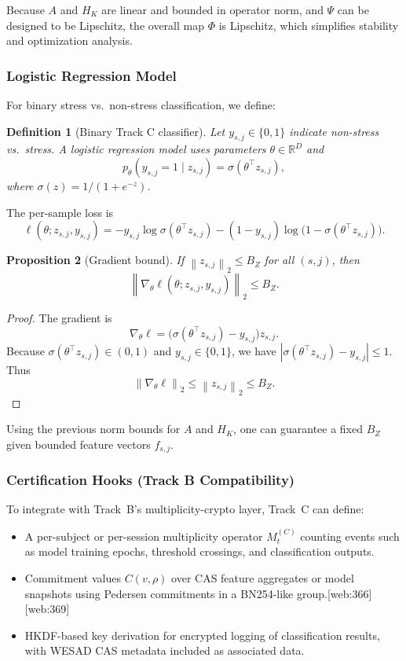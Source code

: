 \documentclass[11pt]{article}
\newtheorem{definition}{Definition}[section]
\newtheorem{proposition}[definition]{Proposition}
\newcommand{\R}{\mathbb{R}}
\newcommand{\norm}[1]{\left\lVert #1 \right\rVert}
\newcommand{\abs}[1]{\left\lvert #1 \right\rvert}
\begin{document}
Because \(A\) and \(H_K\) are linear and bounded in operator norm, and \(\Psi\) can be designed to be Lipschitz, the overall map \(\Phi\) is Lipschitz, which simplifies stability and optimization analysis.

\subsubsection{Logistic Regression Model}

For binary stress vs.\ non-stress classification, we define:

\begin{definition}[Binary Track C classifier]
Let \(y_{s,j} \in \{0,1\}\) indicate non-stress vs.\ stress.
A logistic regression model uses parameters \(\theta \in \R^D\) and
\[
  p_{\theta}(y_{s,j}=1 \mid z_{s,j}) = \sigma(\theta^\top z_{s,j}),
\]
where \(\sigma(z) = 1/(1+e^{-z})\).
\end{definition}

The per-sample loss is
\[
  \ell(\theta; z_{s,j}, y_{s,j})
  = -y_{s,j} \log \sigma(\theta^\top z_{s,j})
    - (1-y_{s,j}) \log \bigl(1-\sigma(\theta^\top z_{s,j})\bigr).
\]

\begin{proposition}[Gradient bound]
If \(\norm{z_{s,j}}_2 \le B_Z\) for all \((s,j)\), then
\[
  \norm{\nabla_\theta \ell(\theta; z_{s,j}, y_{s,j})}_2 \le B_Z.
\]
\end{proposition}

\begin{proof}
The gradient is
\[
  \nabla_\theta \ell = \bigl(\sigma(\theta^\top z_{s,j}) - y_{s,j}\bigr) z_{s,j}.
\]
Because \(\sigma(\theta^\top z_{s,j}) \in (0,1)\) and \(y_{s,j} \in \{0,1\}\), we have \(\abs{\sigma(\theta^\top z_{s,j}) - y_{s,j}} \le 1\).
Thus
\[
  \norm{\nabla_\theta \ell}_2 \le \norm{z_{s,j}}_2 \le B_Z.
\]
\end{proof}

Using the previous norm bounds for \(A\) and \(H_K\), one can guarantee a fixed \(B_Z\) given bounded feature vectors \(f_{s,j}\).

\subsubsection{Certification Hooks (Track B Compatibility)}

To integrate with Track~B's multiplicity-crypto layer, Track~C can define:

\begin{itemize}
  \item A per-subject or per-session multiplicity operator \(M_t^{(C)}\) counting events such as model training epochs, threshold crossings, and classification outputs.
  \item Commitment values \(C(v,\rho)\) over CAS feature aggregates or model snapshots using Pedersen commitments in a BN254-like group.\cite{Pedersen_ZKDocs,Pedersen_RareSkills}[web:366][web:369]
  \item HKDF-based key derivation for encrypted logging of classification results, with WESAD CAS metadata included as associated data.
\end{itemize}
\end{document}
